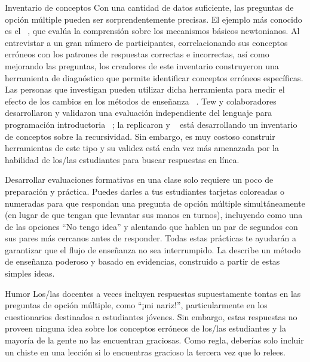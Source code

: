 \begin{aside}{Inventario de conceptos}
Con una cantidad de datos suficiente,
las preguntas de opción múltiple pueden ser sorprendentemente precisas.
El ejemplo más conocido es el
  ~\cite{Hest1992},
que evalúa la comprensión sobre los mecanismos básicos newtonianos.
Al entrevistar a un gran número de participantes,
correlacionando sus conceptos erróneos con los patrones de respuestas correctas e incorrectas,
así como mejorando las preguntas,
los creadores de este inventario construyeron una herramienta de diagnóstico que permite identificar conceptos erróneos específicas.
Las personas  que investigan pueden utilizar dicha herramienta para medir el efecto de los cambios en los métodos de enseñanza ~\cite{Hake1998}.
Tew y colaboradores desarrollaron y validaron una evaluación independiente del lenguaje para programación introductoria ~\cite{Tew2011};
 \cite{Park2016} la replicaron y ~\cite{Hamo2017} está desarrollando un inventario de conceptos sobre la recursividad.
Sin embargo,
es muy costoso construir herramientas de este tipo
y su validez está cada vez más amenazada por la habilidad de los/las estudiantes para buscar respuestas en línea.
\end{aside}

Desarrollar evaluaciones formativas en una clase solo requiere un poco de preparación y práctica.
Puedes darles a tus estudiantes tarjetas coloreadas o numeradas para que respondan una pregunta 
de opción múltiple simultáneamente (en lugar de que tengan que levantar sus manos en turnos), 
incluyendo como una de las opciones ``No tengo idea''
y alentando que hablen un par de segundos con sus pares más cercanos antes de responder. 
Todas estas prácticas te ayudarán a garantizar que el flujo de enseñanza no sea interrumpido.
La  describe un método de enseñanza poderoso y basado en evidencias, 
construido a partir de estas simples ideas. 

\begin{aside}{Humor}
Los/las docentes a veces incluyen respuestas supuestamente tontas en las 
preguntas de opción múltiple, como ``¡mi nariz!'', particularmente en los cuestionarios destinados a estudiantes jóvenes.
Sin embargo,
estas respuestas no proveen ninguna idea sobre los conceptos erróneos de los/las estudiantes 
y la mayoría de la gente no las encuentran graciosas.
Como regla,
deberías solo incluir un chiste en una lección si lo encuentras gracioso la tercera vez que lo relees.
\end{aside}

